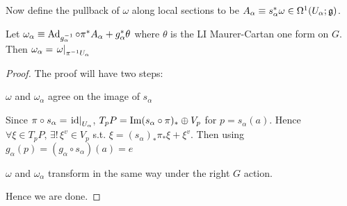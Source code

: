 \documentclass{article}
\begin{document}
Now define the pullback of $\omega$ along local sections to be $A_\alpha \equiv s_\alpha^\ast \omega \in \Omega^1(U_\alpha;\mathfrak{g})$. 
\begin{prop}
	Let $\omega_\alpha \equiv \operatorname{Ad}_{g_\alpha^{-1}} \circ \pi^\ast A_\alpha + g_\alpha^\ast \theta $ where $\theta$ is the LI Maurer-Cartan one form on $G$. Then $\omega_\alpha = \left. \omega \right\rvert_{\pi^{-1}U_\alpha}$
\end{prop}
\begin{proof}
	The proof will have two steps:
	\begin{claim}
		$\omega$ and $\omega_\alpha$ agree on the image of $s_\alpha$
	\end{claim}
	Since $\pi\circ s_\alpha = \left. \operatorname{id} \right\rvert_{U_\alpha}$, $T_pP = \operatorname{Im}(s_\alpha \circ \pi)_\ast \oplus V_p$ for $p = s_\alpha(a)$. Hence $\forall \xi \in T_pP, \, \exists! \, \xi^v \in V_p $ s.t. $\xi = (s_\alpha)_\ast \pi_\ast \xi + \xi^v$. Then using $g_\alpha(p) = (g_\alpha \circ s_\alpha)(a) = e$
	\begin{claim}
		$\omega$ and $\omega_\alpha$ transform in the same way under the right $G$ action. 
	\end{claim}
	Hence we are done. 
\end{proof}
\end{document}

